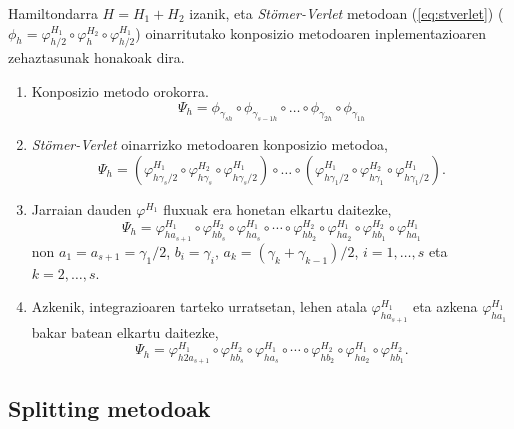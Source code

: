 Hamiltondarra $H=H_1+H_2$ izanik, eta \emph{Stömer-Verlet} metodoan (\ref{eq:stverlet}) ($\phi_h=\varphi_{h/2}^{H_1} \circ \varphi_{h}^{H_2} \circ \varphi_{h/2}^{H_1}$) oinarritutako konposizio metodoaren inplementazioaren zehaztasunak honakoak dira.
\begin{enumerate}
\item Konposizio metodo orokorra.
\begin{equation*}
\Psi_h =\phi_{\gamma_{s h}} \circ \phi_{\gamma_{s-1 h}} \circ \dots \circ \phi_{\gamma_{2 h}} \circ \phi_{\gamma_{1 h}}
\end{equation*}

\item \emph{Stömer-Verlet} oinarrizko metodoaren konposizio metodoa,
\begin{equation*}
\Psi_h =(\varphi_{h \gamma_s/2}^{H_1} \circ \varphi_{h \gamma_s}^{H_2} \circ \varphi_{h \gamma_s/2}^{H_1}) \circ \dots 
       \circ
       (\varphi_{h \gamma_1/2}^{H_1} \circ \varphi_{h \gamma_1}^{H_2} \circ \varphi_{h \gamma_1/2}^{H_1}).  
\end{equation*}

\item Jarraian dauden $\varphi^{H_1}$ fluxuak era honetan elkartu daitezke,
\begin{equation*}
\Psi_h=\varphi_{h a_{s+1}}^{H_1} \circ \varphi_{h b_s}^{H_2} \circ \varphi_{h a_s}^{H_1} \circ \cdots 
       \circ
       \varphi_{h b_2}^{H_2} 
       \circ
       \varphi_{h a_2}^{H_1} \circ \varphi_{h b_1}^{H_2} \circ \varphi_{h a_1}^{H_1}  
\end{equation*}
non $a_1=a_{s+1}=\gamma_1/2$, $b_i=\gamma_i$, $a_k=(\gamma_k+\gamma_{k-1})/2$, $i=1,\dots,s$ eta $k=2,\dots,s$.

\item Azkenik, integrazioaren tarteko urratsetan, lehen atala $\varphi_{h a_{s+1}}^{H_1}$ eta azkena $\varphi_{h a_1}^{H_1}$ bakar batean elkartu daitezke,
\begin{equation*}
\Psi_h=\varphi_{h 2 a_{s+1}}^{H_1} \circ \varphi_{h b_s}^{H_2} \circ \varphi_{h a_s}^{H_1} \circ \cdots 
\circ \varphi_{h b_2}^{H_2} 
\circ
\varphi_{h a_2}^{H_1} \circ \varphi_{h b_1}^{H_2}.
\end{equation*}

\end{enumerate}


\subsection{Splitting metodoak}

